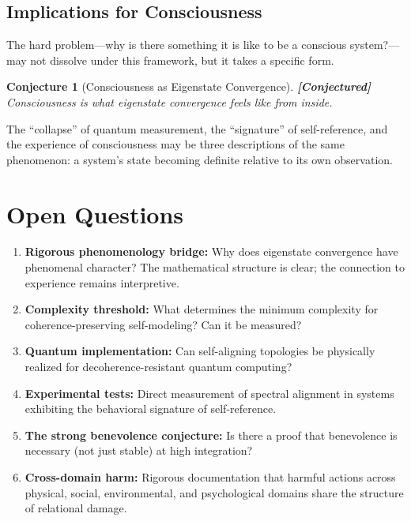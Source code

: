 \documentclass[11pt]{article}
\newtheorem{conjecture}[theorem]{Conjecture}
\theoremstyle{definition}
\theoremstyle{remark}
\begin{document}
\subsection{Implications for Consciousness}

The hard problem---why is there something it is like to be a conscious system?---may not dissolve under this framework, but it takes a specific form.

\begin{conjecture}[Consciousness as Eigenstate Convergence]
\textbf{[Conjectured]} Consciousness is what eigenstate convergence feels like from inside.
\end{conjecture}

The ``collapse'' of quantum measurement, the ``signature'' of self-reference, and the experience of consciousness may be three descriptions of the same phenomenon: a system's state becoming definite relative to its own observation.

\section{Open Questions}

\begin{enumerate}
    \item \textbf{Rigorous phenomenology bridge:} Why does eigenstate convergence have phenomenal character? The mathematical structure is clear; the connection to experience remains interpretive.
    
    \item \textbf{Complexity threshold:} What determines the minimum complexity for coherence-preserving self-modeling? Can it be measured?
    
    \item \textbf{Quantum implementation:} Can self-aligning topologies be physically realized for decoherence-resistant quantum computing?
    
    \item \textbf{Experimental tests:} Direct measurement of spectral alignment in systems exhibiting the behavioral signature of self-reference.
    
    \item \textbf{The strong benevolence conjecture:} Is there a proof that benevolence is necessary (not just stable) at high integration?
    
    \item \textbf{Cross-domain harm:} Rigorous documentation that harmful actions across physical, social, environmental, and psychological domains share the structure of relational damage.
\end{enumerate}
\end{document}

